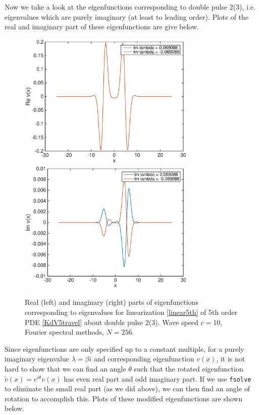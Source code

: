 \documentclass[12pt]{article}
\begin{document}
Now we take a look at the eigenfunctions corresponding to double pulse 2(3), i.e. eigenvalues which are purely imaginary (at least to leading order). Plots of the real and imaginary part of these eigenfunctions are give below.

\begin{figure}[H]
	\includegraphics[width=8.5cm]{four10dp2eigenfnsreal}
	\includegraphics[width=8.5cm]{four10dp2eigenfnsimag}
	\caption{Real (left) and imaginary (right) parts of eigenfunctions corresponding to eigenvalues for linearization \eqref{linear5th} of 5th order PDE \eqref{KdV5travel} about double pulse 2(3). Wave speed $c = 10$, Fourier spectral methods, $N = 256$.}
\end{figure}

Since eigenfunctions are only specified up to a constant multiple, for a purely imaginary eigenvalue $\lambda = \beta i$ and corresponding eigenfunction $v(x)$, it is not hard to show that we can find an angle $\theta$ such that the rotated eigenfunction $\tilde{v}(x) = e^{i \theta} v(x)$ has even real part and odd imaginary part. If we use \texttt{fsolve} to eliminate the small real part (as we did above), we can then find an angle of rotation to accomplish this. Plots of these modified eigenfunctions are shown below.
\end{document}
